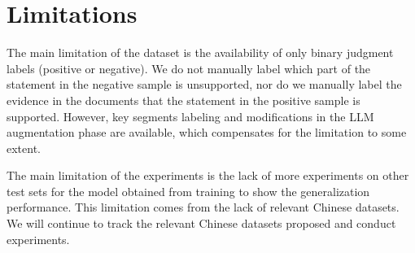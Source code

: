 \section*{Limitations}
The main limitation of the dataset is the availability of only binary judgment labels (positive or negative). We do not manually label which part of the statement in the negative sample is unsupported, nor do we manually label the evidence in the documents that the statement in the positive sample is supported. However, key segments labeling and modifications in the LLM augmentation phase are available, which compensates for the limitation to some extent.

The main limitation of the experiments is the lack of more experiments on other test sets for the model obtained from training to show the generalization performance. This limitation comes from the lack of relevant Chinese datasets. We will continue to track the relevant Chinese datasets proposed and conduct experiments.
